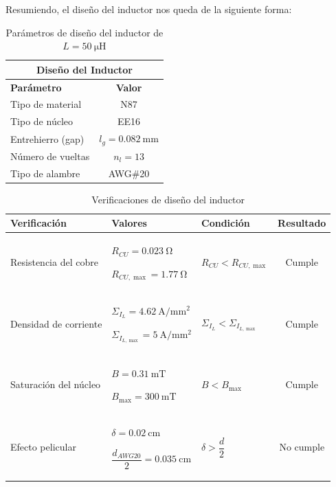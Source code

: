 \documentclass[]{article}
\begin{document}
Resumiendo, el diseño del inductor nos queda de la siguiente forma:

\begin{table}[H]
	\centering
	\renewcommand{\arraystretch}{1.3}
	\begin{tabular}{|l|c|}
		\hline
		\multicolumn{2}{|c|}{\textbf{Diseño del Inductor}} \\
		\hline
		\textbf{Parámetro} & \textbf{Valor} \\
		\hline
		Tipo de material & N87 \\
		\hline
		Tipo de núcleo & EE16 \\
		\hline
		Entrehierro (gap) & $l_g=\SI{0.082}{\milli\meter}$ \\
		\hline
		Número de vueltas & $n_l=13$ \\
		\hline
		Tipo de alambre & AWG\#20 \\
		\hline
	\end{tabular}
	\caption{Parámetros de diseño del inductor de $L=\SI{50}{\micro\henry}$}
	\label{tab:diseno_inductor}
\end{table}


\begin{table}[H]
	\centering
	\renewcommand{\arraystretch}{1.3}
	\begin{tabular}{|p{4cm}|p{4cm}|p{3cm}|c|}
		\hline
		\textbf{Verificación} &
		\textbf{Valores} &
		\textbf{Condición} &
		\textbf{Resultado} \\
		\hline
		
		Resistencia del cobre &
		$R_{CU}=\SI{0.023}{\ohm}$
		
		$R_{CU,\max}=\SI{1.77}{\ohm}$ &
		$R_{CU}<R_{CU,\max}$ &
		Cumple \\
		\hline
		
		Densidad de corriente &
		$\Sigma_{I_L}=\SI{4.62}{\ampere\per\milli\meter^2}$
		
		$\Sigma_{I_{L,\max}}=\SI{5}{\ampere\per\milli\meter^2}$ &
		$\Sigma_{I_L}<\Sigma_{I_{L,\max}}$ &
		Cumple \\
		\hline
		
		Saturación del núcleo &
		$B=\SI{0.31}{\milli\tesla}$
		
		$B_{\max}=\SI{300}{\milli\tesla}$ &
		$B<B_{\max}$ &
		Cumple \\
		\hline
		
		Efecto pelicular &
		$\delta=\SI{0.02}{\centi\meter}$
		
		$\dfrac{d_{AWG20}}{2}=\SI{0.035}{\centi\meter}$ &
		$\delta>\dfrac{d}{2}$ &
		No cumple \\
		\hline
		
	\end{tabular}
	\caption{Verificaciones de diseño del inductor}
	\label{tab:verificaciones_inductor}
\end{table}
\end{document}
